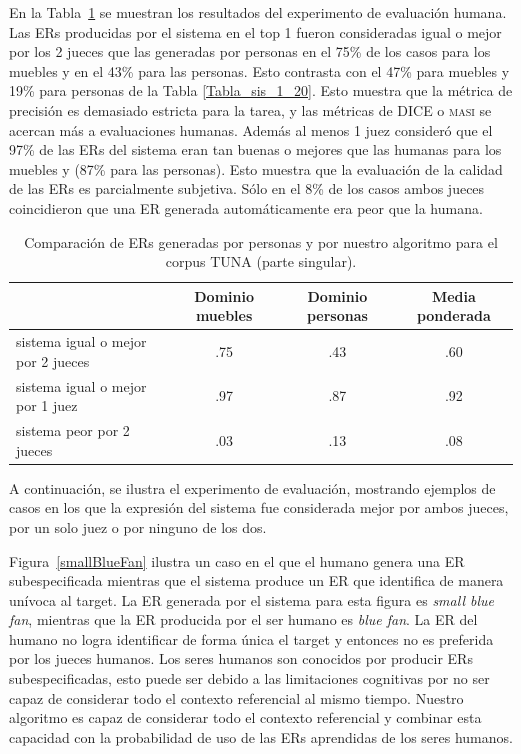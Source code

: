 En la Tabla~\ref{system-versus-human} se muestran los resultados del experimento de evaluaci\'on humana.
Las ERs producidas por el sistema en el top 1 fueron consideradas igual o mejor por los 2 jueces que las generadas por personas en el 75\% de los casos para los muebles y en el 43\% para las personas. Esto contrasta con el 47\% para muebles y 19\% para personas de la Tabla \ref{Tabla_sis_1_20}. Esto muestra que la m\'etrica de precisi\'on es demasiado estricta para la tarea, y las m\'etricas de DICE o \textsc {masi} se acercan m\'as a evaluaciones humanas. Adem\'as al menos 1 juez consider\'o que el 97\% de las ERs del sistema eran tan buenas o mejores que las humanas para los muebles y (87\% para las personas). Esto muestra que la evaluaci\'on de la calidad de las ERs es parcialmente subjetiva. S\'olo en el 8\% de los casos ambos jueces coincidieron que una ER generada autom\'aticamente era peor que la humana.

\begin{table}[h]
\begin{center}
\begin{tabular}{|l|c|c|c|}
\hline

 & Dominio muebles & Dominio personas & Media ponderada \\
\hline
sistema igual o mejor por 2 jueces  &.75  &       .43	&       .60 \\
sistema igual o mejor por 1 juez  &.97	&	.87	&	.92 \\
sistema peor por 2 jueces &	.03	&	.13	&	.08 \\
\hline
\end{tabular}
\caption{Comparaci\'on de ERs generadas por personas y por nuestro algoritmo para el corpus TUNA (parte singular).} 
\label{system-versus-human}
\vspace*{-.5cm}
\end{center}
\end{table}

A continuaci\'on, se ilustra el experimento de evaluaci\'on, mostrando ejemplos de casos en los que la expresi\'on del sistema fue considerada mejor por ambos jueces, por un solo juez o por ninguno de los dos.

Figura~\ref{smallBlueFan} ilustra un caso en el que el humano genera una ER subespecificada mientras que el sistema produce un ER que identifica de manera un\'{i}voca al target. La ER generada por el sistema para esta figura es {\it small blue fan}, mientras que la ER producida por el ser humano es {\it blue fan}. La ER del humano no logra identificar de forma \'unica el target y entonces no es preferida por los jueces humanos. Los seres humanos son conocidos por producir ERs subespecificadas, esto puede ser debido a las limitaciones cognitivas por no ser capaz de considerar todo el contexto referencial al mismo tiempo. Nuestro algoritmo es capaz de considerar todo el contexto referencial y combinar esta capacidad con la probabilidad de uso de las ERs aprendidas de los seres humanos.


